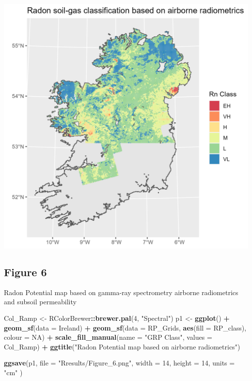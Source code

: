 \documentclass[
  12pt,
]{article}
\newenvironment{Shaded}{\begin{snugshade}}{\end{snugshade}}
\newcommand{\DataTypeTok}[1]{\textcolor[rgb]{0.13,0.29,0.53}{#1}}
\newcommand{\DecValTok}[1]{\textcolor[rgb]{0.00,0.00,0.81}{#1}}
\newcommand{\KeywordTok}[1]{\textcolor[rgb]{0.13,0.29,0.53}{\textbf{#1}}}
\newcommand{\NormalTok}[1]{#1}
\newcommand{\OperatorTok}[1]{\textcolor[rgb]{0.81,0.36,0.00}{\textbf{#1}}}
\newcommand{\OtherTok}[1]{\textcolor[rgb]{0.56,0.35,0.01}{#1}}
\newcommand{\StringTok}[1]{\textcolor[rgb]{0.31,0.60,0.02}{#1}}
\begin{document}
\begin{center}\includegraphics[width=0.5\linewidth]{Rresults/Figure_5} \end{center}

\hypertarget{figure-6}{%
\subsection{Figure 6}\label{figure-6}}

Radon Potential map based on gamma-ray spectrometry airborne
radiometrics and subsoil permeability

\begin{Shaded}
\begin{Highlighting}[]
\NormalTok{  Col\_Ramp \textless{}{-}}\StringTok{ }\NormalTok{RColorBrewer}\OperatorTok{::}\KeywordTok{brewer.pal}\NormalTok{(}\DecValTok{4}\NormalTok{, }\StringTok{"Spectral"}\NormalTok{)}
\NormalTok{  p1 \textless{}{-}}\StringTok{ }\KeywordTok{ggplot}\NormalTok{() }\OperatorTok{+}\StringTok{ }
\StringTok{    }\KeywordTok{geom\_sf}\NormalTok{(}\DataTypeTok{data =}\NormalTok{ Ireland) }\OperatorTok{+}
\StringTok{    }\KeywordTok{geom\_sf}\NormalTok{(}\DataTypeTok{data =}\NormalTok{ RP\_Grids, }\KeywordTok{aes}\NormalTok{(}\DataTypeTok{fill =}\NormalTok{ RP\_class), }\DataTypeTok{colour =} \OtherTok{NA}\NormalTok{) }\OperatorTok{+}
\StringTok{    }\KeywordTok{scale\_fill\_manual}\NormalTok{(}\DataTypeTok{name =} \StringTok{"GRP Class"}\NormalTok{,}
                      \DataTypeTok{values =}\NormalTok{ Col\_Ramp) }\OperatorTok{+}
\StringTok{    }\KeywordTok{ggtitle}\NormalTok{(}\StringTok{"Radon Potential map based on airborne radiometrics"}\NormalTok{) }
  
   \KeywordTok{ggsave}\NormalTok{(p1,}
          \DataTypeTok{file =} \StringTok{"Rresults/Figure\_6.png"}\NormalTok{,}
         \DataTypeTok{width =} \DecValTok{14}\NormalTok{,}
         \DataTypeTok{height =} \DecValTok{14}\NormalTok{,}
         \DataTypeTok{units =} \StringTok{"cm"}\NormalTok{ )}
\end{Highlighting}
\end{Shaded}
\end{document}

